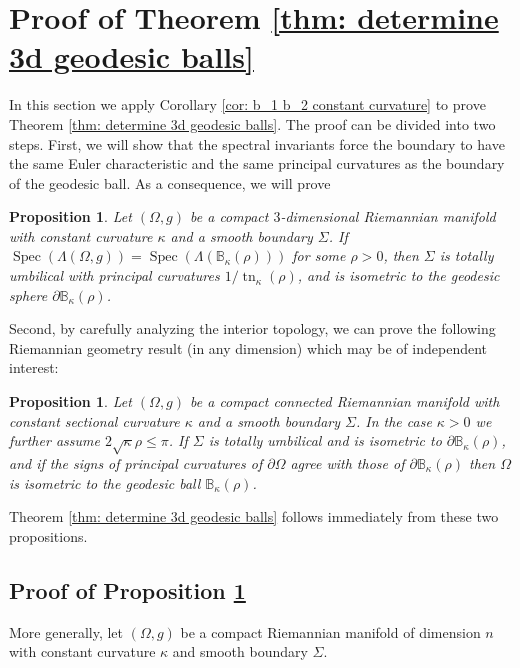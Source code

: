 \documentclass[11pt]{amsart}
\newcommand{\tn}{\operatorname{tn}}
\newcommand{\Spec}{\operatorname{Spec}}
\newtheorem{proposition}[theorem]{Proposition}
\theoremstyle{definition}
\numberwithin{equation}{section}
\begin{document}
\section{Proof of Theorem \ref{thm: determine 3d geodesic balls}}
\label{sec:ProofThm1}

In this section we apply Corollary \ref{cor: b_1 b_2 constant curvature} to prove Theorem \ref{thm: determine 3d geodesic balls}. The proof can be divided into two steps. First, we will show that the spectral invariants force the boundary to have the same Euler characteristic and the same principal curvatures as the boundary of the geodesic ball. As a consequence, we will prove
\begin{proposition}\label{prop: spectrum determines boundary}
	Let $(\Omega,g)$ be a compact $3$-dimensional Riemannian manifold with constant curvature $\kappa$ and a smooth boundary $\Sigma$. 
    If $\Spec(\Lambda(\Omega,g)) = \Spec(\Lambda(\mathbb B_\kappa(\rho)))$ for some $\rho > 0$,  then $\Sigma$ is totally umbilical with principal curvatures $1/\tn_\kappa(\rho)$, and is isometric to the geodesic sphere $\partial\mathbb B_\kappa(\rho)$.
\end{proposition}

Second, by carefully analyzing the interior topology, we can prove the following Riemannian geometry result (in any dimension) which may be of independent interest:

\begin{proposition}\label{prop:iso-to-geod-ball}
	Let $(\Omega,g)$ be a compact connected  Riemannian manifold with constant sectional curvature $\kappa$ and a smooth boundary $\Sigma$. 	In the case $\kappa > 0$ we further assume $2\sqrt{\kappa}\rho \le \pi$.  If $\Sigma$ is totally umbilical and is 
	isometric to $\partial\mathbb B_\kappa(\rho)$, and if the signs of principal curvatures of $\partial\Omega$ agree with those of $\partial\mathbb B_\kappa(\rho)$  
    then $\Omega$ is isometric to the geodesic ball  $\mathbb B_\kappa(\rho)$.  
\end{proposition} 

Theorem \ref{thm: determine 3d geodesic balls} follows immediately from these two propositions.

\subsection{Proof of Proposition \ref{prop:iso-to-geod-ball}}

More generally, let $(\Omega,g)$ be a compact Riemannian manifold of dimension $n$ with constant curvature $\kappa$ and smooth boundary $\Sigma$.  
\end{document}
